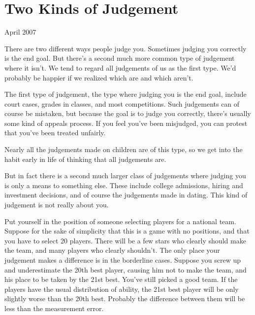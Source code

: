 \chapter{Two Kinds of Judgement}


            
              
                

April 2007

There are two different ways people
                  judge you. Sometimes judging you correctly is the end goal.
                  But there's a second much more common type of judgement where
                  it isn't. We tend to regard all judgements of us as the first
                  type. We'd probably be happier if we realized which are and
                  which aren't.

The first type of judgement, the type
                  where judging you is the end goal, include court cases, grades
                  in classes, and most competitions. Such judgements can of
                  course be mistaken, but because the goal is to judge you
                  correctly, there's usually some kind of appeals process. If
                  you feel you've been misjudged, you can protest that you've
                  been treated unfairly.

Nearly all the judgements
                  made on children are of this type, so we get into the habit
                  early in life of thinking that all judgements are.

But
                  in fact there is a second much larger class of judgements
                  where judging you is only a means to something else. These
                  include college admissions, hiring and investment decisions,
                  and of course the judgements made in dating. This kind of
                  judgement is not really about you.

Put yourself in
                  the position of someone selecting players for a national team.
                  Suppose for the sake of simplicity that this is a game with no
                  positions, and that you have to select 20 players. There will
                  be a few stars who clearly should make the team, and many
                  players who clearly shouldn't. The only place your judgement
                  makes a difference is in the borderline cases. Suppose you
                  screw up and underestimate the 20th best player, causing him
                  not to make the team, and his place to be taken by the 21st
                  best. You've still picked a good team. If the players have the
                  usual distribution of ability, the 21st best player will be
                  only slightly worse than the 20th best. Probably the
                  difference between them will be less than the measurement
                  error.

